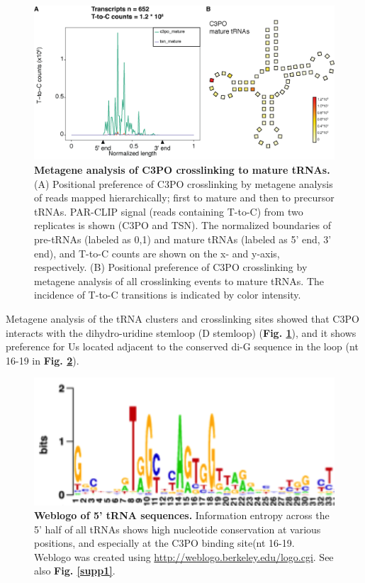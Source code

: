 \documentclass[12pt]{rockefeller}
\begin{document}
\begin{figure}[!ht]%
\centering
\includegraphics[width=\textwidth]{c3po_pos_dep.png} 
\caption[Metagene analysis of C3PO crosslinking to mature tRNAs.]
{
\textbf{Metagene analysis of C3PO crosslinking to mature tRNAs.}
(A) Positional preference of C3PO crosslinking by metagene analysis of reads mapped hierarchically; first to mature and then to precursor tRNAs. PAR-CLIP signal (reads containing T-to-C) from two replicates is shown (C3PO and TSN). The normalized boundaries of pre-tRNAs (labeled as 0,1) and mature tRNAs (labeled as 5’ end, 3’ end), and T-to-C counts are shown on the x- and y-axis, respectively. (B) Positional preference of C3PO crosslinking by metagene analysis of all crosslinking events to mature tRNAs. The incidence of T-to-C transitions is indicated by color intensity.
}
\centering
\label{c3po_pos}%
\end{figure}
Metagene analysis of the tRNA clusters and crosslinking sites showed that C3PO interacts with the dihydro-uridine stemloop (D stemloop) (\textbf{Fig. \ref{c3po_pos}}), and it shows preference for Us located adjacent to the conserved di-G sequence in the loop (nt 16-19 in \textbf{Fig. \ref{weblogo}}). 



\begin{figure}[!ht]%
\centering
\includegraphics[width=4.5in]{weblogo.png} 
\caption[Weblogo of 5' tRNA alignments.]
{
\textbf{Weblogo of 5' tRNA sequences.}
Information entropy across the 5' half of all tRNAs shows high nucleotide conservation at various positions, and especially at the C3PO binding site(nt 16-19. Weblogo was created using \url{http://weblogo.berkeley.edu/logo.cgi}. See also \textbf{Fig. \ref{supp1}}.
}
\centering
\label{weblogo}%
\end{figure}
\end{document}
